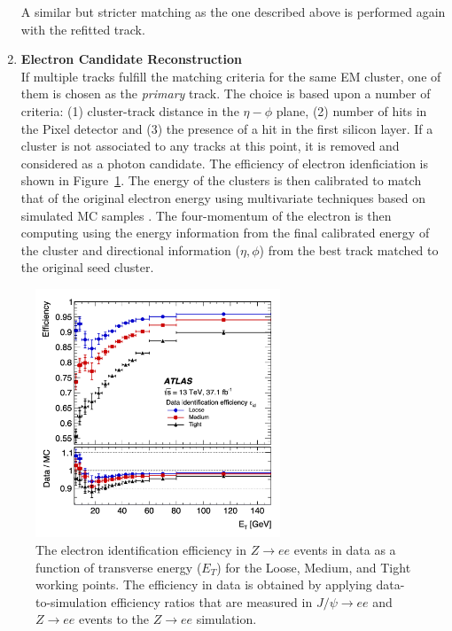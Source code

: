 \begin{enumerate}
        A similar but stricter matching as the one described above is performed again with the refitted track.
    \item \textbf{Electron Candidate Reconstruction}\\
        If multiple tracks fulfill the matching criteria for the same EM cluster, one of them is chosen as the \textit{primary} track.
        The choice is based upon a number of criteria: (1) cluster-track distance in the $\eta-\phi$ plane, (2) number of hits in the Pixel detector and (3) the presence of a hit in the first silicon layer.
        If a cluster is not associated to any tracks at this point, it is removed and considered as a photon candidate.
        The efficiency of electron idenficiation is shown in Figure~\ref{fig:electron_eff_Zee}.
        The energy of the clusters is then calibrated to match that of the original electron energy using multivariate techniques based on simulated MC samples \cite{Aaboud:2018ugz}.
        The four-momentum of the electron is then computing using the energy information from the final calibrated energy of the cluster and directional information ($\eta, \phi$) from the best track matched to the original seed cluster.
\end{enumerate}

\begin{figure}
	\centering
	\includegraphics[width=0.65\textwidth]{electron_eff_Zee}
	\caption{
	    The electron identification efficiency in $Z \rightarrow ee$ events in data as a function of transverse energy ($E_T$) for the Loose, Medium, and Tight working points.
	    The efficiency in data is obtained by applying data-to-simulation efficiency ratios that are measured in $J/\psi \rightarrow ee$ and $Z \rightarrow ee$ events to the $Z \rightarrow ee$ simulation.
	    \cite{Aaboud:2018ugz}
	}
	\label{fig:electron_eff_Zee}
\end{figure}

